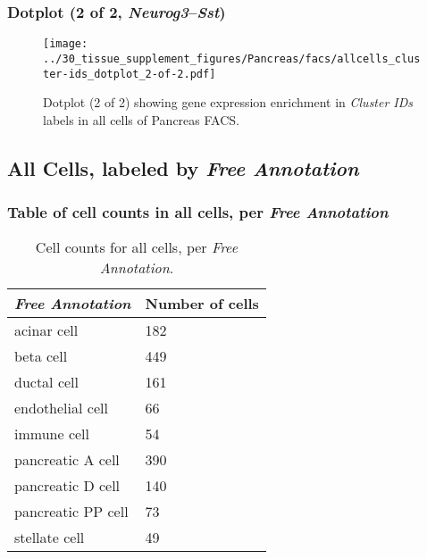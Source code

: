 \clearpage

\subsubsection{Dotplot (2 of 2, \emph{Neurog3}--\emph{Sst})}
\begin{figure}[h]
\centering
\texttt{[image: ../30\_tissue\_supplement\_figures/Pancreas/facs/allcells\_cluster-ids\_dotplot\_2-of-2.pdf]}

\caption{ Dotplot (2 of 2)  showing gene expression enrichment in \emph{Cluster IDs} labels in all cells of Pancreas FACS. }
\end{figure}


\clearpage

\subsection{All Cells, labeled by \emph{Free Annotation}}
\subsubsection{Table of cell counts in all cells, per \emph{Free Annotation}}\begin{table}[h]
\centering
\label{my-label}
\begin{tabular}{@{}ll@{}}
\toprule

\emph{Free Annotation}& Number of cells \\ \midrule
acinar cell & 182 \\

beta cell & 449 \\

ductal cell & 161 \\

endothelial cell & 66 \\

immune cell & 54 \\

pancreatic A cell & 390 \\

pancreatic D cell & 140 \\

pancreatic PP cell & 73 \\

stellate cell & 49 \\
\bottomrule
\end{tabular}
\caption{Cell counts for all cells, per \emph{Free Annotation}.}
\end{table}


